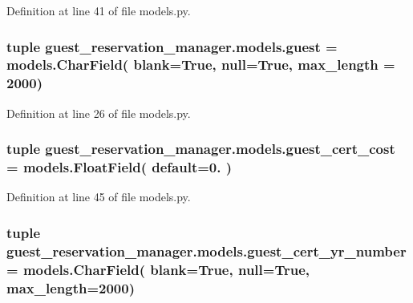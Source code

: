 Definition at line 41 of file models.\-py.

\hypertarget{namespaceguest__reservation__manager_1_1models_a0518066413c1ffe905fa0f536de22dce}{
\subsubsection[{guest}]{\setlength{\rightskip}{0pt plus 5cm}tuple guest\-\_\-reservation\-\_\-manager.\-models.\-guest = models.\-Char\-Field( blank=True, null=True, max\-\_\-length = 2000)}}\label{namespaceguest__reservation__manager_1_1models_a0518066413c1ffe905fa0f536de22dce}


Definition at line 26 of file models.\-py.

\hypertarget{namespaceguest__reservation__manager_1_1models_ae1993f4182f735b068bf110b1fc74215}{
\subsubsection[{guest\-\_\-cert\-\_\-cost}]{\setlength{\rightskip}{0pt plus 5cm}tuple guest\-\_\-reservation\-\_\-manager.\-models.\-guest\-\_\-cert\-\_\-cost = models.\-Float\-Field( default=0. )}}\label{namespaceguest__reservation__manager_1_1models_ae1993f4182f735b068bf110b1fc74215}


Definition at line 45 of file models.\-py.

\hypertarget{namespaceguest__reservation__manager_1_1models_a476f6f9f9cf0fefbc2584d5316220d06}{
\subsubsection[{guest\-\_\-cert\-\_\-yr\-\_\-number}]{\setlength{\rightskip}{0pt plus 5cm}tuple guest\-\_\-reservation\-\_\-manager.\-models.\-guest\-\_\-cert\-\_\-yr\-\_\-number = models.\-Char\-Field( blank=True, null=True, max\-\_\-length=2000)}}\label{namespaceguest__reservation__manager_1_1models_a476f6f9f9cf0fefbc2584d5316220d06}


